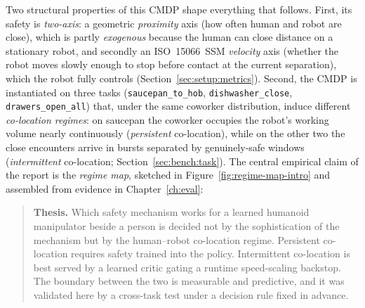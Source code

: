 \documentclass[11pt,a4paper]{report}
\newcommand{\ssm}{SSM}
\newcommand{\iso}{ISO~15066}
\begin{document}
Two structural properties of this CMDP shape everything that
follows. First, its safety is \emph{two-axis}: a geometric
\emph{proximity} axis (how often human and robot are close), which is
partly \emph{exogenous} because the human can close distance on a
stationary robot, and secondly an \iso{}~\ssm{} \emph{velocity} axis (whether
the robot moves slowly enough to stop before contact at the current
separation), which the robot fully controls
(Section~\ref{sec:setup:metrics}). Second, the CMDP is instantiated
on three tasks (\texttt{saucepan\_to\_hob}, \texttt{dishwasher\_close},
\texttt{drawers\_open\_all}) that, under the same coworker
distribution, induce different \emph{co-location regimes}: on
saucepan the coworker occupies the robot's working volume nearly
continuously (\emph{persistent} co-location), while on the other two
the close encounters arrive in bursts separated by genuinely-safe
windows (\emph{intermittent} co-location;
Section~\ref{sec:bench:task}). The central empirical claim of the
report is the \emph{regime map}, sketched in
Figure~\ref{fig:regime-map-intro} and assembled from evidence in
Chapter~\ref{ch:eval}:

\begin{quote}
\textbf{Thesis.} Which safety mechanism works for a learned humanoid
manipulator beside a person is decided not by the sophistication of
the mechanism but by the human--robot co-location regime. Persistent
co-location requires safety trained into the policy. Intermittent
co-location is best served by a learned critic gating a runtime
speed-scaling backstop. The boundary between the two is measurable
and predictive, and it was validated here by a cross-task test under
a decision rule fixed in advance.
\end{quote}
\end{document}
